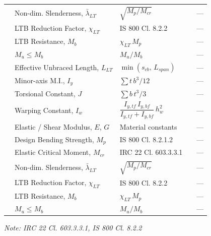 \documentclass[12pt,a4paper]{report}
\numberwithin{figure}{chapter}
\begin{document}
\begin{longtable}{|C{2.22cm}|L{2.99cm}|L{3.67cm}|C{2.14cm}|C{2.22cm}|}
 & Non-dim. Slenderness, $\bar{\lambda}_{LT}$ & $\sqrt{M_p / M_{cr}}$ &  & --- \\*
 & LTB Reduction Factor, $\chi_{LT}$ & IS 800 Cl. 8.2.2 &  & --- \\*
 & LTB Resistance, $M_b$ & $\chi_{LT}\,M_p$ &  & --- \\*
 & $M_u \leq M_b$ & $M_u / M_b$ &  & --- \\
\hline
{}
 & Effective Unbraced Length, $L_{LT}$ & $\min(s_{cb},\,L_{span})$ &  & --- \\*
 & Minor-axis M.I., $I_y$ & $\sum t\,b^3/12$ &  & --- \\
\hline
{}
 & Torsional Constant, $J$ & $\sum b\,t^3/3$ &  & --- \\*
 & Warping Constant, $I_w$ & $\dfrac{I_{y,tf}\,I_{y,bf}}{I_{y,tf}+I_{y,bf}}\,h_w^2$ &  & --- \\*
 & Elastic / Shear Modulus, $E$, $G$ & Material constants &  & --- \\*
 & Design Bending Strength, $M_p$ & IS 800 Cl. 8.2.1.2 &  & --- \\*
 & Elastic Critical Moment, $M_{cr}$ & IRC 22 Cl. 603.3.3.1 &  & --- \\*
 & Non-dim. Slenderness, $\bar{\lambda}_{LT}$ & $\sqrt{M_p / M_{cr}}$ &  & --- \\*
 & LTB Reduction Factor, $\chi_{LT}$ & IS 800 Cl. 8.2.2 &  & --- \\*
 & LTB Resistance, $M_b$ & $\chi_{LT}\,M_p$ &  & --- \\*
 & $M_u \leq M_b$ & $M_u / M_b$ &  & --- \\
\hline
\end{longtable}
\noindent\textit{Note: IRC 22 Cl. 603.3.3.1, IS 800 Cl. 8.2.2}
\end{document}
